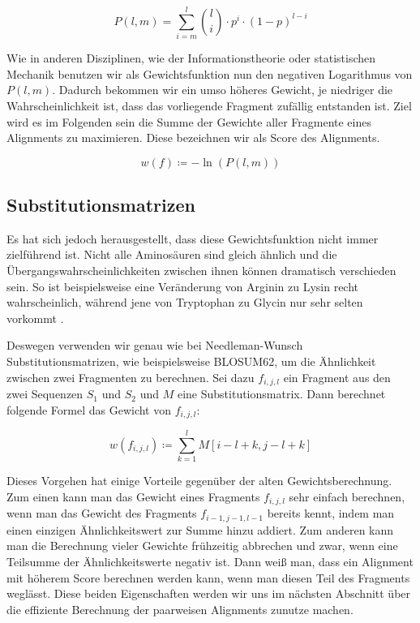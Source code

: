 \begin{equation}
	P(l,m) = \sum_{i=m}^{l} {l \choose i} \cdot p^i \cdot (1-p)^{l-i}
\end{equation}

Wie in anderen Disziplinen, wie der Informationstheorie oder statistischen Mechanik benutzen wir als Gewichtsfunktion nun den negativen Logarithmus von $P(l,m)$. Dadurch bekommen wir ein umso höheres Gewicht, je niedriger die Wahrscheinlichkeit ist, dass das vorliegende Fragment zufällig entstanden ist. Ziel wird es im Folgenden sein die Summe der Gewichte aller Fragmente eines Alignments zu maximieren. Diese bezeichnen wir als Score des Alignments.

\begin{equation}
	w(f) \coloneqq -\ln(P(l,m))	
\end{equation}

\subsection{Substitutionsmatrizen}\label{subsec:subs_matr}

Es hat sich jedoch herausgestellt, dass diese Gewichtsfunktion nicht immer zielführend ist. Nicht alle Aminosäuren sind gleich ähnlich und die Übergangswahrscheinlichkeiten zwischen ihnen können dramatisch verschieden sein. So ist beispielsweise eine Veränderung von Arginin zu Lysin recht wahrscheinlich, während jene von Tryptophan zu Glycin nur sehr selten vorkommt \citep{p13}. 

Deswegen verwenden wir genau wie bei Needleman-Wunsch Substitutionsmatrizen, wie beispielsweise BLOSUM62, um die Ähnlichkeit zwischen zwei Fragmenten zu berechnen. Sei dazu $f_{i,j,l}$ ein Fragment aus den zwei Sequenzen $S_1$ und $S_2$ und $M$ eine Substitutionsmatrix. Dann berechnet folgende Formel das Gewicht von $f_{i,j,l}$:

\begin{equation}
	w(f_{i,j,l}) \coloneqq \sum_{k=1}^{l} M[i\!-\!l\!+\!k,j\!-\!l\!+\!k]
\end{equation}

Dieses Vorgehen hat einige Vorteile gegenüber der alten Gewichtsberechnung. Zum einen kann man das Gewicht eines Fragments $f_{i,j,l}$ sehr einfach berechnen, wenn man das Gewicht des Fragments $f_{i-1,j-1,l-1}$ bereits kennt, indem man einen einzigen Ähnlichkeitswert zur Summe hinzu addiert. Zum anderen kann man die Berechnung vieler Gewichte frühzeitig abbrechen und zwar, wenn eine Teilsumme der Ähnlichkeitswerte negativ ist. Dann weiß man, dass ein Alignment mit höherem Score berechnen werden kann, wenn man diesen Teil des Fragments weglässt. Diese beiden Eigenschaften werden wir uns im nächsten Abschnitt über die effiziente Berechnung der paarweisen Alignments zunutze machen.

